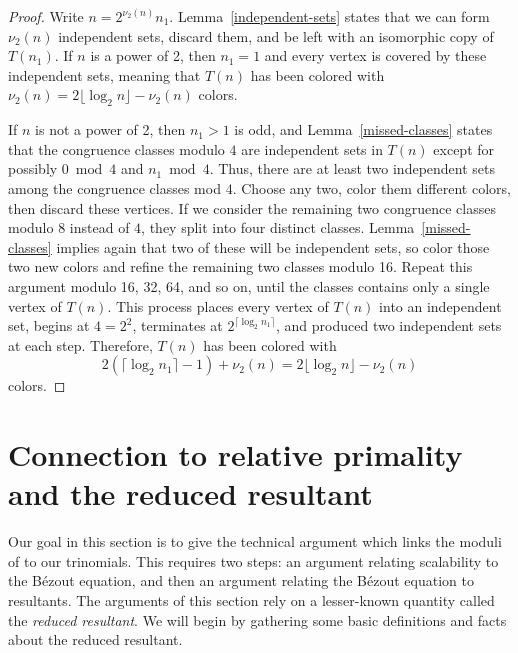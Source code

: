 \documentclass[]{article}
\theoremstyle{definition}
\begin{document}
\begin{proof}
    Write $n = 2^{\nu_2(n)} n_1$. Lemma~\ref{independent-sets} states that we can
    form $\nu_2(n)$ independent sets, discard them, and be left with an
    isomorphic copy of $T(n_1)$. If $n$ is a power of 2, then $n_1 = 1$ and
    every vertex is covered by these independent sets, meaning that $T(n)$ has
    been colored with $\nu_2(n) = 2 \lfloor \log_2 n \rfloor - \nu_2(n)$ colors.

    If $n$ is not a power of 2, then $n_1 > 1$ is odd, and
    Lemma~\ref{missed-classes} states that the congruence classes modulo $4$ are
    independent sets in $T(n)$ except for possibly $0 \bmod 4$ and $n_1 \bmod
    4$. Thus, there are at least two independent sets among the congruence
    classes mod $4$. Choose any two, color them different colors, then discard
    these vertices. If we consider the remaining two congruence classes modulo
    $8$ instead of $4$, they split into four distinct classes.
    Lemma~\ref{missed-classes} implies again that two of these will be
    independent sets, so color those two new colors and refine the remaining two
    classes modulo 16. Repeat this argument modulo 16, 32, 64, and so on, until
    the classes contains only a single vertex of $T(n)$. This process places
    every vertex of $T(n)$ into an independent set, begins at $4 = 2^2$,
    terminates at $2^{\lceil \log_2 n_1 \rceil}$, and produced two independent
    sets at each step. Therefore, $T(n)$ has been colored with
    \begin{equation*}
        2 (\lceil \log_2 n_1 \rceil - 1) + \nu_2(n) = 2 \lfloor \log_2 n \rfloor - \nu_2(n)
    \end{equation*}
    colors.
\end{proof}

\section{Connection to relative primality and the reduced resultant}
\label{sec:equivalence}

Our goal in this section is to give the technical argument which links the
moduli of \cite{zima} to our trinomials. This requires two steps: an argument
relating scalability to the B\'ezout equation, and then an argument relating the
B\'ezout equation to resultants. The arguments of this section rely on a
lesser-known quantity called the \emph{reduced resultant}. We will begin by
gathering some basic definitions and facts about the reduced resultant.
\end{document}
